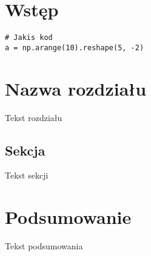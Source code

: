 


\maketitle
\tableofcontents

\chapter{Wstęp}


\pagebreak

\begin{verbatim}
# Jakis kod
a = np.arange(10).reshape(5, -2)
\end{verbatim}



\chapter{Nazwa rozdziału}

Tekst rozdziału


\section{Sekcja}
\label{Sec:Nazwa sekcji}

Tekst sekcji

\chapter{Podsumowanie}

Tekst podsumowania




\listoffigures
\listoftables


